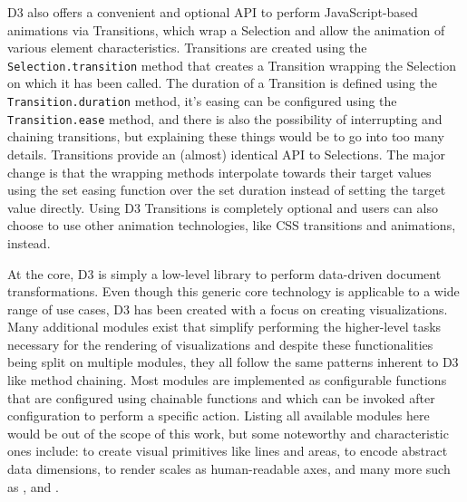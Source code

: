 D3 also offers a convenient and optional API to perform JavaScript-based animations via Transitions, which wrap a Selection and allow the animation of various element characteristics. Transitions are created using the \lstinline{Selection.transition} method that creates a Transition wrapping the  Selection on which it has been called. The duration of a Transition is defined using the \lstinline{Transition.duration} method, it's easing can be configured using the \lstinline{Transition.ease} method, and there is also the possibility of interrupting and chaining transitions, but explaining these things would be to go into too many details. Transitions provide an (almost) identical API to Selections. The major change is that the wrapping methods interpolate towards their target values using the set easing function over the set duration instead of setting the target value directly. Using D3 Transitions is completely optional and users can also choose to use other animation technologies, like CSS transitions and animations, instead.

At the core, D3 is simply a low-level library to perform data-driven document transformations. Even though this generic core technology is applicable to a wide range of use cases, D3 has been created with a focus on creating visualizations. Many additional modules exist that simplify performing the higher-level tasks necessary for the rendering of visualizations and despite these functionalities being split on multiple modules, they all follow the same patterns inherent to D3 like method chaining. Most modules are implemented as configurable functions that are configured using chainable functions and which can be invoked after configuration to perform a specific action. Listing all available modules here would be out of the scope of this work, but some noteworthy and characteristic ones include:  to create visual primitives like lines and areas,  to encode abstract data dimensions,  to render scales as human-readable axes, and many more such as ,  and .



